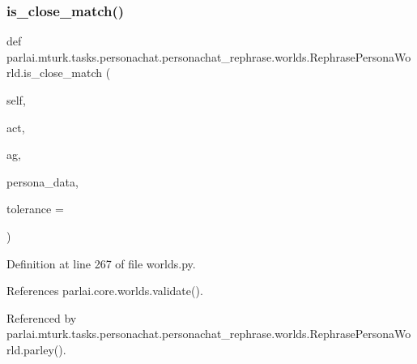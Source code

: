 \subsubsection{\texorpdfstring{is\+\_\+close\+\_\+match()}{is\_close\_match()}}
{\footnotesize\ttfamily def parlai.\+mturk.\+tasks.\+personachat.\+personachat\+\_\+rephrase.\+worlds.\+Rephrase\+Persona\+World.\+is\+\_\+close\+\_\+match (\begin{DoxyParamCaption}\item[{}]{self,  }\item[{}]{act,  }\item[{}]{ag,  }\item[{}]{persona\+\_\+data,  }\item[{}]{tolerance = {} }\end{DoxyParamCaption})}



Definition at line 267 of file worlds.\+py.



References parlai.\+core.\+worlds.\+validate().



Referenced by parlai.\+mturk.\+tasks.\+personachat.\+personachat\+\_\+rephrase.\+worlds.\+Rephrase\+Persona\+World.\+parley().

